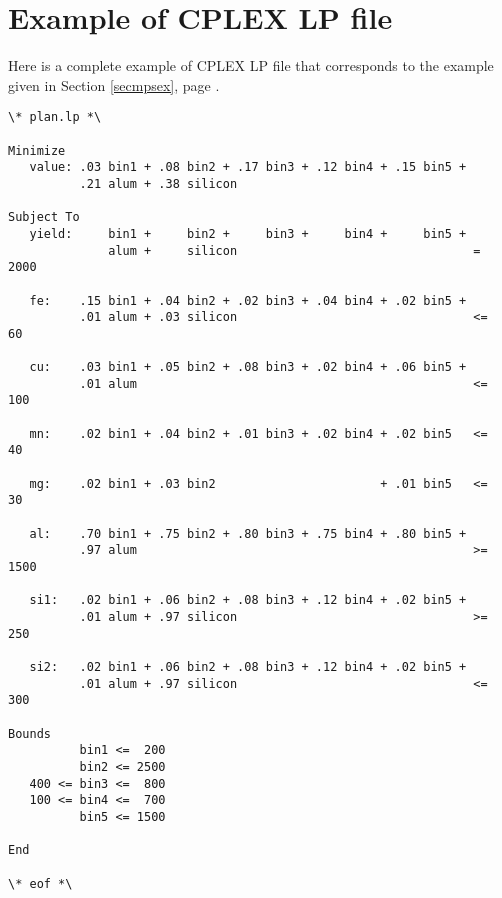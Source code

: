 \section{Example of CPLEX LP file}

Here is a complete example of CPLEX LP file that corresponds to the
example given in Section \ref{secmpsex}, page \pageref{secmpsex}.

{\footnotesize
\begin{verbatim}
\* plan.lp *\

Minimize
   value: .03 bin1 + .08 bin2 + .17 bin3 + .12 bin4 + .15 bin5 +
          .21 alum + .38 silicon

Subject To
   yield:     bin1 +     bin2 +     bin3 +     bin4 +     bin5 +
              alum +     silicon                                 =  2000

   fe:    .15 bin1 + .04 bin2 + .02 bin3 + .04 bin4 + .02 bin5 +
          .01 alum + .03 silicon                                 <=   60

   cu:    .03 bin1 + .05 bin2 + .08 bin3 + .02 bin4 + .06 bin5 +
          .01 alum                                               <=  100

   mn:    .02 bin1 + .04 bin2 + .01 bin3 + .02 bin4 + .02 bin5   <=   40

   mg:    .02 bin1 + .03 bin2                       + .01 bin5   <=   30

   al:    .70 bin1 + .75 bin2 + .80 bin3 + .75 bin4 + .80 bin5 +
          .97 alum                                               >= 1500

   si1:   .02 bin1 + .06 bin2 + .08 bin3 + .12 bin4 + .02 bin5 +
          .01 alum + .97 silicon                                 >=  250

   si2:   .02 bin1 + .06 bin2 + .08 bin3 + .12 bin4 + .02 bin5 +
          .01 alum + .97 silicon                                 <=  300

Bounds
          bin1 <=  200
          bin2 <= 2500
   400 <= bin3 <=  800
   100 <= bin4 <=  700
          bin5 <= 1500

End

\* eof *\
\end{verbatim}

}

